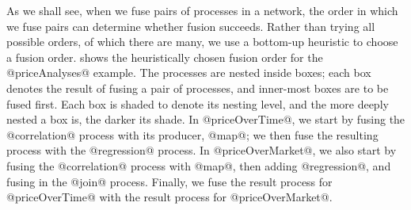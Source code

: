 As we shall see, when we fuse pairs of processes in a network, the order in which we fuse pairs can determine whether fusion succeeds.
Rather than trying all possible orders, of which there are many, we use a bottom-up heuristic to choose a fusion order.
 shows the heuristically chosen fusion order for the @priceAnalyses@ example.
The processes are nested inside boxes; each box denotes the result of fusing a pair of processes, and inner-most boxes are to be fused first.
Each box is shaded to denote its nesting level, and the more deeply nested a box is, the darker its shade.
In @priceOverTime@, we start by fusing the @correlation@ process with its producer, @map@; we then fuse the resulting process with the @regression@ process.
In @priceOverMarket@, we also start by fusing the @correlation@ process with @map@, then adding @regression@, and fusing in the @join@ process.
Finally, we fuse the result process for @priceOverTime@ with the result process for @priceOverMarket@.




